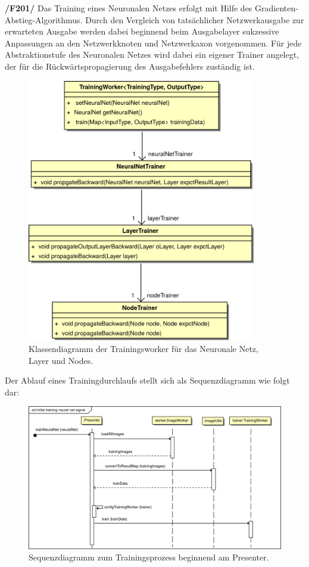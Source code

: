 \textbf{/F201/} Das Training eines Neuronalen Netzes erfolgt mit Hilfe des Gradienten-Abstieg-Algorithmus. Durch den Vergleich von tatsächlicher Netzwerkausgabe zur erwarteten Ausgabe werden dabei beginnend beim Ausgabelayer sukzessive Anpassungen an den Netzwerkknoten und Netzwerkaxon vorgenommen. Für jede Abstraktionstufe des Neuronalen Netzes wird dabei ein eigener Trainer angelegt, der für die Rückwärtspropagierung des Ausgabefehlers zuständig ist.\\[-0.5cm]
\begin{figure}[H]
\begin{center}
\includegraphics[width=10cm]{Abbildungen/UML/jan/trainerCD.png}
\caption{Klassendiagramm der Trainingsworker für das Neuronale Netz, Layer und Nodes.}
\label{fig_cdTraining}
\end{center}
\end{figure}
Der Ablauf eines Trainingdurchlaufs stellt sich als Sequenzdiagramm wie folgt dar:
\begin{figure}[H]
\begin{center}
\includegraphics[width=14.2cm]{Abbildungen/UML/jan/trainNeuralNet.png}
\caption{Sequenzdiagramm zum Trainingsprozess beginnend am Presenter.}
\label{fig_sdTraining}
\end{center}
\end{figure}
